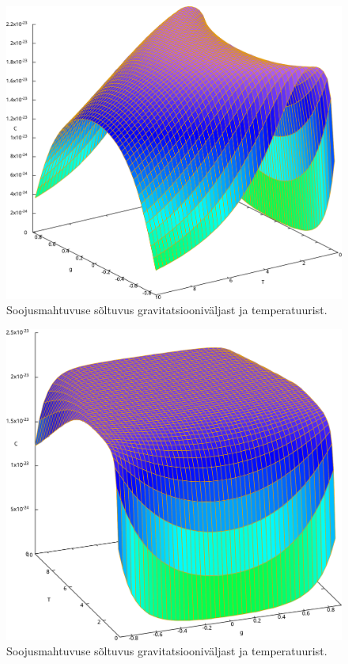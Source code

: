 \documentclass{trkut}%
\begin{document}
\begin{figure}[htb]
    \includegraphics[width=\textwidth]{maxima/m1a1b1T0_10S100.pdf}
    \caption{Soojusmahtuvuse sõltuvus gravitatsiooniväljast ja temperatuurist.}
\end{figure}
\begin{figure}[htb]
    \includegraphics[width=\textwidth]{maxima/m1a1b1T0_10S400.pdf}
    \caption{Soojusmahtuvuse sõltuvus gravitatsiooniväljast ja temperatuurist.}
\end{figure}
\end{document}
